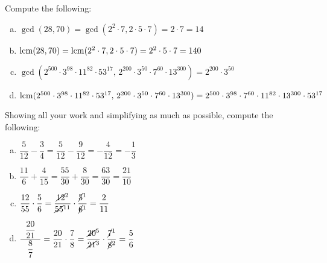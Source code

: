 \documentclass[12pt,letterpaper]{exam}
\begin{document}
\begin{questions}
\newpage



\question[8] Compute the following: \pspace
        \begin{enumerate}[(a)]
        \item $\gcd(28, 70)= \gcd(2^2 \cdot 7, 2 \cdot 5 \cdot 7)= 2 \cdot 7= 14$ \vfill
        \item $\operatorname{lcm}(28, 70)= \operatorname{lcm}(2^2 \cdot 7, 2 \cdot 5 \cdot 7)= 2^2 \cdot 5 \cdot 7= 140$ \vfill
        \item $\gcd(2^{500} \cdot 3^{98} \cdot 11^{82} \cdot 53^{17},\, 2^{200} \cdot 3^{50} \cdot 7^{60} \cdot 13^{300})= 2^{200} \cdot 3^{50}$ \vfill
        \item $\operatorname{lcm}(2^{500} \cdot 3^{98} \cdot 11^{82} \cdot 53^{17},\, 2^{200} \cdot 3^{50} \cdot 7^{60} \cdot 13^{300})= 2^{500} \cdot 3^{98} \cdot 7^{60} \cdot 11^{82} \cdot 13^{300} \cdot 53^{17}$ \vfill
        \end{enumerate}



\newpage



\question[8] Showing all your work and simplifying as much as possible, compute the following: \pspace
	\begin{enumerate}[(a)]
	\item $\dfrac{5}{12} - \dfrac{3}{4}= \dfrac{5}{12} - \dfrac{9}{12}= -\dfrac{4}{12}= -\dfrac{1}{3}$ \vfill
	\item $\dfrac{11}{6} + \dfrac{4}{15}= \dfrac{55}{30} + \dfrac{8}{30}= \dfrac{63}{30}= \dfrac{21}{10}$ \vfill
	\item $\dfrac{12}{55} \cdot \dfrac{5}{6}= \dfrac{\cancel{12}^2}{\cancel{55}^{11}} \cdot \dfrac{\cancel{5}^1}{\cancel{6}^1}= \dfrac{2}{11}$ \vfill
	\item $\dfrac{\;\;\dfrac{20}{21}\;\;}{\dfrac{8}{7}}= \dfrac{20}{21} \cdot \dfrac{7}{8}= \dfrac{\cancel{20}^5}{\cancel{21}^3} \cdot \dfrac{\cancel{7}^1}{\cancel{8}^2}= \dfrac{5}{6}$ \vfill
	\end{enumerate}



\newpage




\end{questions}
\end{document}
